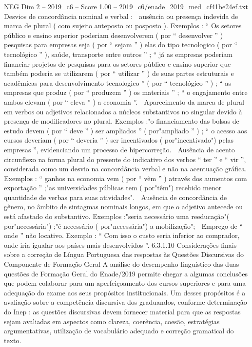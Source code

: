 \begin{textsample}{NEG Dim 2 – 2019\_c6 – Score 1.00 – 2019\_c6/enade\_2019\_med\_cf41be24ef.txt}
Desvios de concordância nominal e verbal :  ausência ou presença indevida de marca de plural ( com sujeito anteposto ou posposto ).
Exemplos : “ Os setores público e ensino superior poderiam desenvolverem ( por “ desenvolver ” ) pesquisas para empresas seja ( por “ sejam ” ) elas do tipo tecnologico ( por “ tecnológico ” ), saúde, transporte entre outros ” ; “ já as empresas poderiam financiar projetos de pesquisas para os setores público e ensino superior que também poderia se utilizarem ( por “ utilizar ” ) de suas partes estruturais e acadêmicas para desenvolvimento tecnologico ” ( por “ tecnológico ” ) ; “ as empresas que produz ( por “ produzem ” ) os materiais ” ; “ o engajamento entre ambos elevam ( por “ eleva ” ) a economia ”.  Aparecimento da marca de plural em verbos ou adjetivos relacionados a núcleos substantivos no singular devido à presença de modificadores no plural.
Exemplos :"o financiamento das bolsas de estudo devem ( por “ deve ” ) ser ampliados ” ( por"ampliado ” ) ; “ o acesso aos cursos deveriam ( por “ deveria ” ) ser incentivados ( por"incentivado") pelas empresas ”, evidenciando um processo de hipercorreção.  Ausência de acento circunflexo na forma plural do presente do indicativo dos verbos “ ter ” e “ vir ”, considerada como um desvio na concordância verbal e não na acentuação gráfica.
Exemplos : “ ganhos na economia vem ( por “ vêm ” ) através dos aumentos com exportação ” ;"as universidades públicas tem ( por"têm") recebido menor quantidade de verbas para suas atividades".  Ausência de concordância de gênero, no âmbito de sintagmas nominais longos, em que o adjetivo antecede ou está afastado do substantivo.
Exemplos :"seria necessário uma reeducação"( por"necessária") ;"é necessário ( por"necessária") a mobilização";  Emprego de “ onde ” não locativo.
Exemplo : “ Com isso o custo seria inferior ao comprador, onde iria igualar aos países mais desenvolvidos ”. 6.3.1.10 Considerações finais sobre a correção de Língua Portuguesa das respostas às Questões Discursivas do Componente de Formação Geral A análise do desempenho linguístico das duas questões de Formação Geral do Enade/2019 permite chegar a algumas conclusões que podem colaborar para um aperfeiçoamento dos cursos superiores e para uma adequação do exame aos seus propósitos institucionais.
Um desses propósitos é a avaliação sobre a competência discursiva dos graduandos, conforme determinação do Inep : as questões discursivas devem fornecer material para que as respostas sejam avaliadas em aspectos como clareza, coerência, coesão, estratégias argumentativas, utilização de vocabulário adequado e correção gramatical do texto.

\end{textsample}
